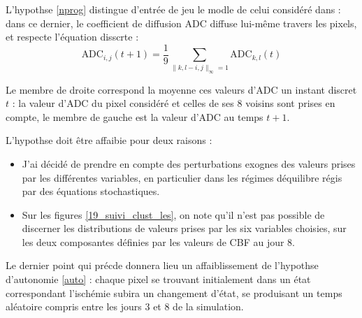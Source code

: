 \begin{comment}
\begin{center}
\begin{enumerate}
\item\label{bbbbb} nnnnn
\end{enumerate}
\end{center}
\end{comment}


L'hypothse \ref{nprog} distingue d'entr\'ee de jeu le modle de celui consid\'er\'e dans \cite{Duval_JCBFM_02} : %
dans ce dernier, le coefficient de diffusion ADC diffuse lui-m\^eme  travers les pixels, et respecte l'\'equation disscrte :
\[\text{ADC}_{i,j}(t+1)=\frac{1}{9}\sum\limits_{\|k,l-i,j\|_{\infty}=1}\text{ADC}_{k,l}(t)\]

Le membre de droite correspond  la moyenne ces valeurs d'ADC  un instant discret $t$ : %
la valeur d'ADC du pixel consid\'er\'e et celles de ses $8$ voisins sont prises en compte, %
le membre de gauche est la valeur d'ADC au temps $t+1$.

\par
L'hypothse \label{var_comp} doit \^etre affaibie pour deux raisons :
\begin{itemize}
\item J'ai d\'ecid\'e de prendre en compte des perturbations exognes des valeurs prises par les diff\'erentes variables, %
en particulier dans les r\'egimes d\'equilibre r\'egis par des \'equations stochastiques.
\item Sur les figures \ref{19_suivi_clust_les}, on note qu'il n'est pas possible de discerner les distributions de valeurs prises par les six variables choisies, %
sur les deux composantes d\'efinies par les valeurs de CBF au jour 8.
\end{itemize}

\par
Le dernier point qui pr\'ecde donnera lieu  un affaiblissement de l'hypothse d'autonomie \ref{auto} : %
chaque pixel se trouvant initialement dans un \'etat correspondant  l'isch\'emie subira un changement d'\'etat, %
se produisant  un temps al\'eatoire compris entre les jours 3 et 8 de la simulation.

